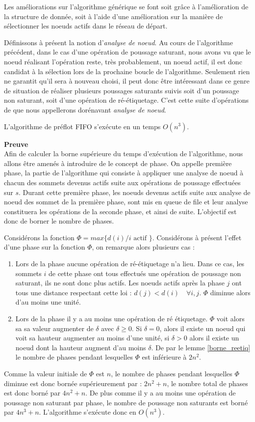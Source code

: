 Les améliorations sur l'algorithme générique se font soit grâce à l'amélioration de la structure de
donnée, soit à l'aide d'une amélioration sur la manière de sélectionner les noeuds actifs dans le
réseau de départ.

Définissons à présent la notion d'\emph{analyse de noeud}. Au cours de l'algorithme précédent, dans
le cas d'une opération de poussage saturant, nous avons vu que le noeud réalisant l'opération reste,
très probablement, un noeud actif, il est donc candidat à la sélection lors de la prochaine boucle
de l'algorithme. Seulement rien ne garantit qu'il sera à nouveau choisi, il peut donc être
intéressant dans ce genre de situation de réaliser plusieurs poussages saturants suivis soit d'un
poussage non saturant, soit d'une opération de ré-étiquetage. C'est cette suite d'opérations de que
nous appellerons dorénavant \emph{analyse de noeud}.

\begin{thrm}
	L'algorithme de préflot FIFO s'exécute en un temps $O(n^3)$.
\end{thrm}

\textbf{Preuve} \\
Afin de calculer la borne supérieure du temps d'exécution de l'algorithme, nous allons être	amenés à
introduire de le concept de phase. On appelle première phase, la partie de l'algorithme qui consiste
à appliquer une analyse de noeud à chacun des sommets devenus actifs suite aux opérations de
poussage effectuées sur $s$. Durant cette première phase, les noeuds devenus actifs suite aux
analyse de noeud des sommet de la première phase, sont mis en queue de file et leur analyse
constituera les opérations de la seconde phase, et ainsi de suite. L'objectif est donc de borner le
nombre de phases.

Considérons la fonction $\Phi = max \{d(i) / i \mbox{ actif }\}$. Considérons à présent l'effet
d'une phase sur la fonction $\Phi$, on remarque alors plusieurs cas :
\begin{enumerate}
	\item Lors de la phase aucune opération de ré-étiquetage n'a lieu. Dans ce cas, les sommets $i$ de
		cette phase ont tous effectués une opération de poussage non saturant, ils ne sont donc plus
		actifs. Les noeuds actifs après la phase $j$ ont tous une distance respectant cette loi : $d(j)
		< d(i) \quad \forall i, j$. $\Phi$ diminue alors d'au moins une unité.
	\item Lors de la phase il y a au moins une opération de ré étiquetage. $\Phi$ voit alors sa sa
		valeur augmenter de $\delta$ avec $\delta \geq 0$. Si $\delta = 0$, alors il existe un noeud qui
		voit sa hauteur augmenter au moins d'une unité, si $\delta > 0$ alors il existe un noeud dont la
		hauteur augment d'au moins $\delta$. De par le lemme \ref{borne_reetiq} le nombre de phases
		pendant lesquelles $\Phi$ est inférieure à $2n^2$.
\end{enumerate}
Comme la valeur initiale de $\Phi$ est $n$, le nombre de phases pendant lesquelles $\Phi$ diminue
est donc bornée supérieurement par : $2n^2 + n$, le nombre total de phases est donc borné par $4n^2
+ n$. De plus comme il y a au moins une opération de poussage non saturant par phase, le nombre de
poussage non saturants est borné par $4n^3 + n$. L'algorithme s'exécute donc en $O(n^3)$.
